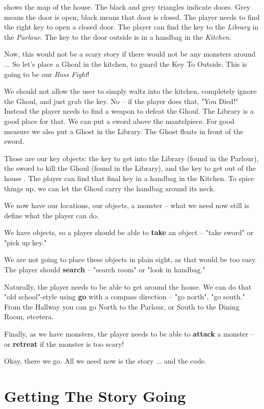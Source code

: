 shows the map of the house. The black and grey triangles indicate doors. Grey means the door is open, black means that door is closed. The player needs to find the right key to open a closed door. The player can find the key to the \emph{Library} in the \emph{Parlour}. The key to the door outside is in a handbag in the \emph{Kitchen}. 

Now, this would not be a scary story if there would not be any monsters around ... So let's place a Ghoul in the kitchen, to guard the Key To Outside. This is going to be our \emph{Boss Fight}! 

We should not allow the user to simply waltz into the kitchen, completely ignore the Ghoul, and just grab the key. No -- if the player does that, "You Died!" Instead the player needs to find a weapon to defeat the Ghoul. The Library is a good place for that. We can put a sword above the mantelpiece. For good measure we also put a Ghost in the Library. The Ghost floats in front of the sword. 

Those are our key objects: the key to get into the Library (found in the Parlour), the sword to kill the Ghoul (found in the Library), and the key to get out of the house . The player can find that final key in a handbag in the Kitchen. To spice things up, we can let the Ghoul carry the handbag around its neck.  

We now have our locations, our objects, a monster -- what we need now still is define what the player can do. 

We have objects, so a player should be able to \textbf{take} an object -- "take sword" or "pick up key." 

We are not going to place these objects in plain sight, as that would be too easy. The player should \textbf{search} -- "search room" or "look in handbag." 

Naturally, the player needs to be able to get around the house. We can do that "old school"-style using \textbf{go} with a compass direction -- "go north", "go south." From the Hallway you can go North to the Parlour, or South to the Dining Room, etcetera. 

Finally, as we have monsters, the player needs to be able to \textbf{attack} a monster -- or \textbf{retreat} if the monster is too scary! 

Okay, there we go. All we need now is the story ... and the code. 

\section{Getting The Story Going} 

